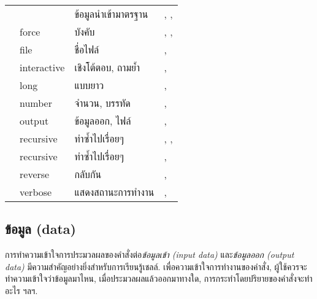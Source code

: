 \begin{thwbr}
\bigskip
{}\label{tab:options}
\tablelasttail{\hline}
\begin{supertabular}{c|l|p{.4\linewidth}|l}
\cmd{-} & & ข้อมูลนำเข้ามาตรฐาน & , , \\
 & force & บังคับ & , , \\
 & file & ชื่อไฟล์ & , \\
 & interactive & เชิงโต้ตอบ, ถามย้ำ & , \\
 & long & แบบยาว & , \\
 & number & จำนวน, บรรทัด &, \\
 & output & ข้อมูลออก, ไฟล์ & , \\
 & recursive & ทำซ้ำไปเรื่อยๆ & , , \\
 & recursive & ทำซ้ำไปเรื่อยๆ & , \\
 & reverse & กลับกัน & , \\
 & verbose & แสดงสถานะการทำงาน & , \\
\end{supertabular}
\bigskip


\subsection{ข้อมูล (data)}
การทำความเข้าใจการประมวลผลของคำสั่งต่อ\emph{ข้อมูลเข้า (input data)} และ\emph{ข้อมูลออก (output data)} มีความสำคัญอย่างยิ่งสำหรับการเรียนรู้เชลล์. เพื่อความเข้าใจการทำงานของคำสั่ง, ผู้ใช้ควรจะทำความเข้าใจว่าข้อมูลมาไหน, เมื่อประมวลผลแล้วออกมาทางใด, การกระทำโดยปริยายของคำสั่งจะทำอะไร ฯลฯ.



\end{thwbr}
